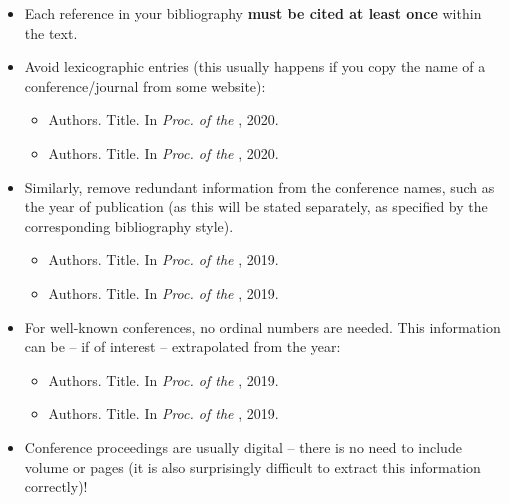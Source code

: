 \documentclass[11pt,a4paper]{article}
\begin{document}
\begin{itemize}
\item Each reference in your bibliography \textbf{must be cited at least once} within the text.

\item Avoid lexicographic entries (this usually happens if you copy the name of a conference/journal from some website):
%
\vspace{-0.25cm}
%
\begin{itemize}
\item Authors. Title. In \emph{Proc. of the }, 2020.
\item Authors. Title. In \emph{Proc. of the }, 2020.
\end{itemize}

\item Similarly, remove redundant information from the conference names, such as the year of publication (as this will be stated separately, as specified by the corresponding bibliography style).
%
\vspace{-0.25cm}
%
\begin{itemize}
\item Authors. Title. In \emph{Proc. of the }, 2019.
\item Authors. Title. In \emph{Proc. of the }, 2019.
\end{itemize}

\item For well-known conferences, no ordinal numbers are needed. This information can be
-- if of interest -- extrapolated from the year:
%
\vspace{-0.25cm}
%
\begin{itemize}
\item Authors. Title. In \emph{Proc. of the }, 2019.
\item Authors. Title. In \emph{Proc. of the }, 2019.
\end{itemize}

\item Conference proceedings are usually digital – there is no need to include volume or pages (it is also surprisingly difficult to extract this information correctly)!

\end{itemize}
\end{document}
